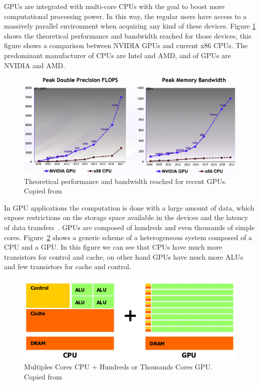 GPUs are integrated with multi-core CPUs with the goal to boost more computational processing power. In this way, the regular users have access to a massively parallel environment when acquiring any kind of these devices. Figure \ref{fig:gflops} shows the theoretical performance and bandwidth reached for those devices, this figure shows a comparison between NVIDIA GPUs and current x86 CPUs. The predominant manufacturer of CPUs are Intel and AMD, and of GPUs are NVIDIA and AMD.

\begin{figure}[htpb]
\centering
\includegraphics[width=\linewidth]{./images/Volta-GPU.png}
\caption{Theoretical performance and bandwidth reached for recent GPUs. Copied from~\cite{CUDAGuide}}
\label{fig:gflops}
\end{figure}

In GPU applications the computation is done with a large amount of data, which expose restrictions on the storage space available in the devices and the latency of data transfers~\citep{Gregg:2011}. GPUs are composed of hundreds and even thousands of simple cores. Figure~\ref{fig:gpuComp} shows a generic scheme of a heterogeneous system composed of a CPU and a GPU. In this figure we can see that CPUs have much more transistors for control and cache, on other hand GPUs have much more ALUs and few transistors for cache and control. 


\begin{figure}[htpb]
\centering
\includegraphics[scale=.85]{./images/gpu-computing.png}
\caption{Multiples Cores CPU + Hundreds or Thousands Cores GPU. Copied from~\cite{CUDAGuide}}
\label{fig:gpuComp}
\end{figure}

